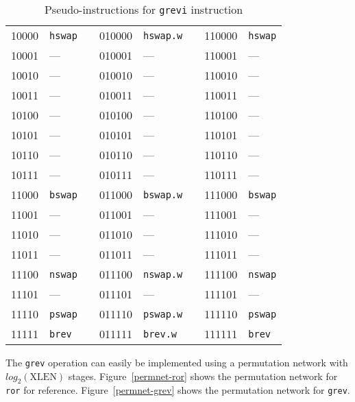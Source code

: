 \begin{table}[h]
\begin{small}
\begin{center}
\begin{tabular}{l l p{0.5in} l l p{0.3in} l l}
\cline{1-2}
\cline{4-5}
\cline{7-8}

10000 & {\tt hswap}   &   &   010000 & {\tt hswap.w} &   &   110000 & {\tt hswap} \\
10001 & ---           &   &   010001 & ---           &   &   110001 & ---         \\
10010 & ---           &   &   010010 & ---           &   &   110010 & ---         \\
10011 & ---           &   &   010011 & ---           &   &   110011 & ---         \\
10100 & ---           &   &   010100 & ---           &   &   110100 & ---         \\
10101 & ---           &   &   010101 & ---           &   &   110101 & ---         \\
10110 & ---           &   &   010110 & ---           &   &   110110 & ---         \\
10111 & ---           &   &   010111 & ---           &   &   110111 & ---         \\

\cline{1-2}
\cline{4-5}
\cline{7-8}

11000 & {\tt bswap}   &   &   011000 & {\tt bswap.w} &   &   111000 & {\tt bswap} \\
11001 & ---           &   &   011001 & ---           &   &   111001 & ---         \\
11010 & ---           &   &   011010 & ---           &   &   111010 & ---         \\
11011 & ---           &   &   011011 & ---           &   &   111011 & ---         \\
11100 & {\tt nswap}   &   &   011100 & {\tt nswap.w} &   &   111100 & {\tt nswap} \\
11101 & ---           &   &   011101 & ---           &   &   111101 & ---         \\
11110 & {\tt pswap}   &   &   011110 & {\tt pswap.w} &   &   111110 & {\tt pswap} \\
11111 & {\tt brev}    &   &   011111 & {\tt brev.w}  &   &   111111 & {\tt brev}  \\
\end{tabular}
\end{center}
\end{small}
\caption{Pseudo-instructions for {\tt grevi} instruction}
\label{grevi-modes}
\end{table}

The {\tt grev} operation can easily be implemented using a permutation
network with $log_2(\textrm{XLEN})$ stages. Figure~\ref{permnet-ror}
shows the permutation network for {\tt ror} for reference.
Figure~\ref{permnet-grev} shows the permutation network for {\tt grev}.

